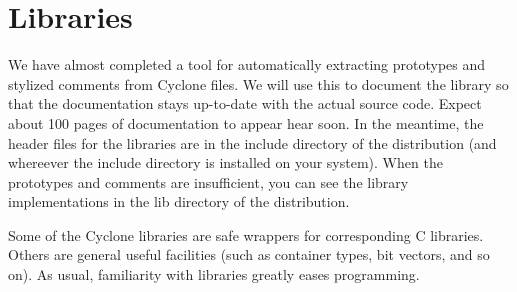 \section{Libraries}

We have almost completed a tool for automatically extracting
prototypes and stylized comments from Cyclone files.  We will use this
to document the library so that the documentation stays up-to-date
with the actual source code.  Expect about 100 pages of documentation
to appear hear soon.  In the meantime, the header files for
the libraries are in the include directory of the distribution (and
whereever the include directory is installed on your system).  When
the prototypes and comments are insufficient, you can see the library
implementations in the lib directory of the distribution.

Some of the Cyclone libraries are safe wrappers for corresponding C
libraries.  Others are general useful facilities (such as container
types, bit vectors, and so on).  As usual, familiarity with libraries
greatly eases programming.

\ifscreen
{}
\else
{}
\fi




